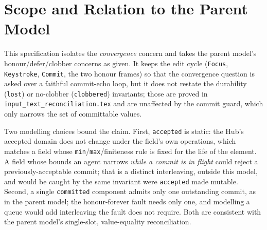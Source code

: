 \documentclass[a4paper,10pt,fleqn]{article}
\begin{document}
\section{Scope and Relation to the Parent Model}
\label{sec:scope}

This specification isolates the \emph{convergence} concern and takes the parent
model's honour/defer/clobber concerns as given.  It keeps the edit cycle
(\texttt{Focus}, \texttt{Keystroke}, \texttt{Commit}, the two honour frames) so
that the convergence question is asked over a faithful commit-echo loop, but it
does not restate the durability (\texttt{lost}) or no-clobber
(\texttt{clobbered}) invariants; those are proved in
\texttt{input\_text\_reconciliation.tex} and are unaffected by the commit guard,
which only narrows the set of committable values.

Two modelling choices bound the claim.  First, \texttt{accepted} is static: the
Hub's accepted domain does not change under the field's own operations, which
matches a field whose \texttt{min}/\texttt{max}/finiteness rule is fixed for the
life of the element.  A field whose bounds an agent narrows \emph{while a commit
is in flight} could reject a previously-acceptable commit; that is a distinct
interleaving, outside this model, and would be caught by the same invariant were
\texttt{accepted} made mutable.  Second, a single \texttt{committed} component
admits only one outstanding commit, as in the parent model; the honour-forever
fault needs only one, and modelling a queue would add interleaving the fault does
not require.  Both are consistent with the parent model's single-slot,
value-equality reconciliation.
\end{document}
